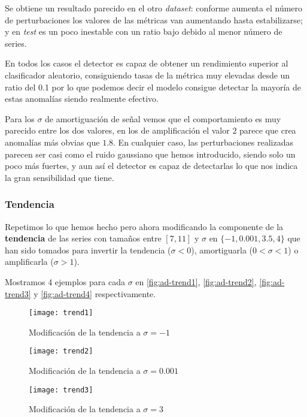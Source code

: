 Se obtiene un resultado parecido en el otro \emph{dataset}: conforme aumenta el número de perturbaciones los valores de las métricas van aumentando hasta estabilizarse; y en \emph{test} es un poco inestable con un ratio bajo debido al menor número de series.

En todos los casos el detector es capaz de obtener un rendimiento superior al clasificador aleatorio, consiguiendo tasas de la métrica muy elevadas desde un ratio del 0.1 por lo que podemos decir el modelo consigue detectar la mayoría de estas anomalías siendo realmente efectivo.

Para los $\sigma$ de amortiguación de señal vemos que el comportamiento es muy parecido entre los dos valores, en los de amplificación el valor $2$ parece que crea anomalías más obvias que $1.8$. En cualquier caso, las perturbaciones realizadas parecen ser casi como el ruido gaussiano que hemos introducido, siendo solo un poco más fuertes, y aun así el detector es capaz de detectarlas lo que nos indica la gran sensibilidad que tiene.

\subsubsection{Tendencia}

Repetimos lo que hemos hecho pero ahora modificando la componente de la \textbf{tendencia} de las series con tamaños entre $[7, 11]$ y $\sigma$ en $\{-1, 0.001, 3.5, 4\}$ que han sido tomados para invertir la tendencia ($\sigma < 0$), amortiguarla ($0 < \sigma < 1$) o amplificarla ($\sigma > 1$).

Mostramos 4 ejemplos para cada $\sigma$ en \autoref{fig:ad-trend1}, \autoref{fig:ad-trend2}, \autoref{fig:ad-trend3} y \autoref{fig:ad-trend4} respectivamente.

\begin{figure}[htpb]
  \centering
  \texttt{[image: trend1]}
  \caption{Modificación de la tendencia a $\sigma = -1$}
  \label{fig:ad-trend1}
\end{figure}

\begin{figure}[htpb]
  \centering
  \texttt{[image: trend2]}
  \caption{Modificación de la tendencia a $\sigma = 0.001$}
  \label{fig:ad-trend2}
\end{figure}


\begin{figure}[htpb]
  \centering
  \texttt{[image: trend3]}
  \caption{Modificación de la tendencia a $\sigma = 3$}
  \label{fig:ad-trend3}
\end{figure}


